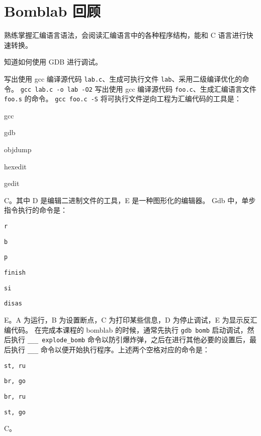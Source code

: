 \chapter{Bomblab 回顾}
    \begin{summary}
        \begin{compactitem}
            \item 熟练掌握汇编语言语法，会阅读汇编语言中的各种程序结构，能和 C 语言进行快速转换。
            \item 知道如何使用 GDB 进行调试。
        \end{compactitem}
    \end{summary}

    \begin{problems}
        \pro 写出使用 gcc 编译源代码 \verb|lab.c|、生成可执行文件 \verb|lab|、采用二级编译优化的命令。
        \sol \verb|gcc lab.c -o lab -O2|
        \pro 写出使用 gcc 编译源代码 \verb|foo.c|、生成汇编语言文件 \verb|foo.s| 的命令。
        \sol \verb|gcc foo.c -S|
        \pro 将可执行文件逆向工程为汇编代码的工具是：
        \begin{choices}
            \item gcc
            \item gdb
            \item objdump
            \item hexedit
            \item gedit
        \end{choices}
        \sol C。其中 D 是编辑二进制文件的工具，E 是一种图形化的编辑器。
        \pro Gdb 中，单步指令执行的命令是：
        \begin{choices}
            \item \verb|r|
            \item \verb|b|
            \item \verb|p|
            \item \verb|finish|
            \item \verb|si|
            \item \verb|disas|
        \end{choices}
        \sol E。A 为运行，B 为设置断点，C 为打印某些信息，D 为停止调试，E 为显示反汇编代码。
         在完成本课程的 bomblab 的时候，通常先执行 \verb|gdb bomb| 启动调试，然后执行 \verb|___ explode_bomb| 命令以防引爆炸弹，之后在进行其他必要的设置后，最后执行 \verb|___| 命令以便开始执行程序。上述两个空格对应的命令是：
        \begin{choices}
            \item \verb|st, ru|
            \item \verb|br, go|
            \item \verb|br, ru|
            \item \verb|st, go|
        \end{choices}
        \sol C。
    \end{problems}
